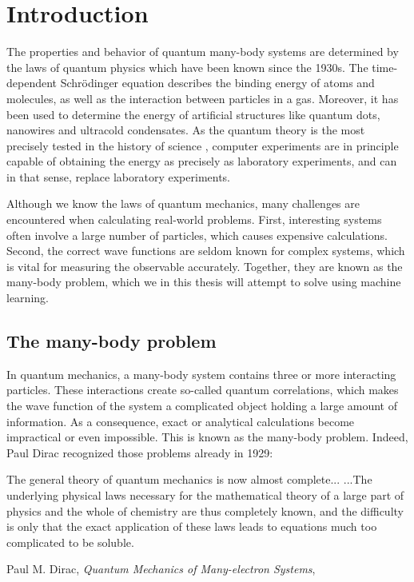 \chapter{Introduction}
The properties and behavior of quantum many-body systems are determined by the laws of quantum physics which have been known since the 1930s. The time-dependent Schrödinger equation describes the binding energy of atoms and molecules, as well as the interaction between particles in a gas. Moreover, it has been used to determine the energy of artificial structures like quantum dots, nanowires and ultracold condensates. As the quantum theory is the most precisely tested in the history of science \supercite{odom_new_2006}, computer experiments are in principle capable of obtaining the energy as precisely as laboratory experiments, and can in that sense, replace laboratory experiments.

Although we know the laws of quantum mechanics, many challenges are encountered when calculating real-world problems. First, interesting systems often involve a large number of particles, which causes expensive calculations. Second, the correct wave functions are seldom known for complex systems, which is vital for measuring the observable accurately. Together, they are known as the many-body problem, which we in this thesis will attempt to solve using machine learning.

\section{The many-body problem}
In quantum mechanics, a many-body system contains three or more interacting particles. These interactions create so-called quantum correlations, which makes the wave function of the system a complicated object holding a large amount of information. As a consequence, exact or analytical calculations become impractical or even impossible. This is known as the many-body problem. Indeed, Paul Dirac recognized those problems already in 1929:

\begin{shadequote}{
		The general theory of quantum mechanics is now almost complete... ...The underlying physical laws necessary for the mathematical theory of a large part of physics and the whole of chemistry are thus completely known, and the difficulty is only that the exact application of these laws leads to equations much too complicated to be soluble. \par Paul M. Dirac, \emph{Quantum Mechanics of Many-electron Systems}, \supercite{dirac_paul_adrien_maurice_quantum_1929}}
\end{shadequote}

